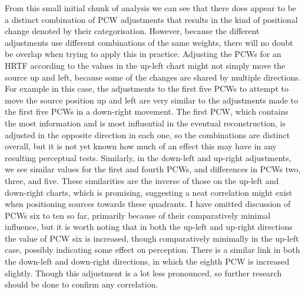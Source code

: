 From this small initial chunk of analysis we can see that there does appear to be a distinct combination of PCW adjustments that results in the kind of positional change denoted by their categorisation. However, because the different adjustments use different combinations of the same weights, there will no doubt be overlap when trying to apply this in practice. Adjusting the PCWs for an HRTF according to the values in the up-left chart might not simply move the source up and left, because some of the changes are shared by multiple directions. For example in this case, the adjustments to the first five PCWs to attempt to move the source position up and left are very similar to the adjustments made to the first five PCWs in a down-right movement. The first PCW, which contains the most information and is most influential in the eventual reconstruction, is adjusted in the opposite direction in each one, so the combinations are distinct overall, but it is not yet known how much of an effect this may have in any resulting perceptual tests. Similarly, in the down-left and up-right adjustments, we see similar values for the first and fourth PCWs, and differences in PCWs two, three, and five. These similarities are the inverse of those on the up-left and down-right charts, which is promising, suggesting a neat correlation might exist when positioning sources towards these quadrants. I have omitted discussion of PCWs six to ten so far, primarily because of their comparatively minimal influence, but it is worth noting that in both the up-left and up-right directions the value of PCW six is increased, though comparatively minimally in the up-left case, possibly indicating some effect on perception. There is a similar link in both the down-left and down-right directions, in which the eighth PCW is increased slightly. Though this adjustment is a lot less pronounced, so further research should be done to confirm any correlation.